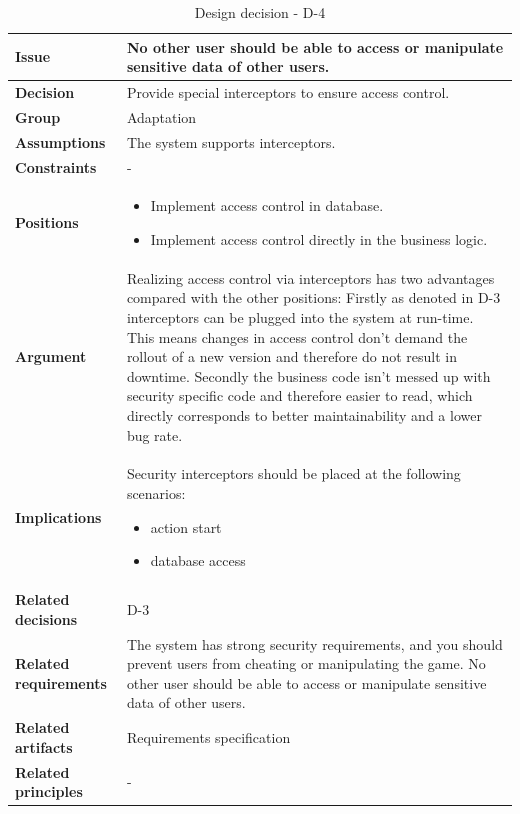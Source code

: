 \documentclass[11pt]{article}
\begin{document}
\begin{table}[h] \small
	\begin{tabularx}{\textwidth}{ | l | X |}
    	\hline
	\cellcolor[gray]{0.9}
    	\textbf{Issue} & No other user should be able to access or manipulate sensitive data of other users. \\
	\hline
	\cellcolor[gray]{0.9}
	\textbf{Decision} & Provide special interceptors to ensure access control. \\
	\hline
	\cellcolor[gray]{0.9}
	\textbf{Group} & Adaptation \\
	\hline
	\cellcolor[gray]{0.9}
	\textbf{Assumptions} & The system supports interceptors. \\
	\hline
	\cellcolor[gray]{0.9}
	\textbf{Constraints} & - \\
	\hline
	\cellcolor[gray]{0.9}
	\textbf{Positions} &
		\begin{itemize}
		\item Implement access control in database.
		\item Implement access control directly in the business logic.
		\end{itemize}\\
	\hline
	\cellcolor[gray]{0.9}
	\textbf{Argument} & Realizing access control via interceptors has two advantages compared with the other positions: Firstly as denoted in D-3 interceptors can be plugged into the system at run-time. This means changes in access control don't demand the rollout of a new version and therefore do not result in downtime. Secondly the business code isn't messed up with security specific code and therefore easier to read, which directly corresponds to better maintainability and a lower bug rate. \\
	\hline
	\cellcolor[gray]{0.9}
	\textbf{Implications} & Security interceptors should be placed at the following scenarios:
		\begin{itemize}
		\item action start
		\item database access
		\end{itemize}\\
	\hline
	\cellcolor[gray]{0.9}
	\textbf{Related decisions} & D-3 \\
	\hline
	\cellcolor[gray]{0.9}
	\textbf{Related requirements} & The system has strong security requirements, and you should prevent users from cheating or manipulating the game. No other user should be able to access or manipulate sensitive data of other users.\\
	\hline
	\cellcolor[gray]{0.9}
	\textbf{Related artifacts} & Requirements specification\\
	\hline
	\cellcolor[gray]{0.9}
	\textbf{Related principles} & -\\
	\hline
	\end{tabularx}
	\caption{Design decision - D-4}
	\label{dec:D4}
\end{table}
\end{document}
